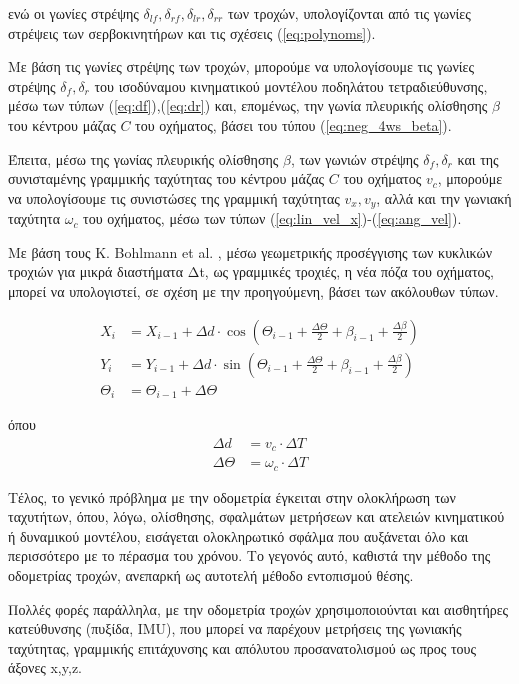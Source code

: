 \bigskip\noindent
ενώ  οι γωνίες στρέψης $\delta_{lf}, \delta_{rf}, \delta_{lr}, \delta_{rr}$ των τροχών, υπολογίζονται από τις γωνίες στρέψεις των σερβοκινητήρων και τις σχέσεις (\ref{eq:polynoms}).

\bigskip
Με βάση τις γωνίες στρέψης των τροχών, μπορούμε να υπολογίσουμε τις γωνίες στρέψης $\delta_f, \delta_r$ του {ισοδύναμου κινηματικού μοντέλου ποδηλάτου τετραδιεύθυνσης}, μέσω των τύπων  (\ref{eq:df}),(\ref{eq:dr}) και, επομένως, την γωνία πλευρικής ολίσθησης $\beta$ του κέντρου μάζας $C$ του οχήματος, βάσει του τύπου (\ref{eq:neg_4ws_beta}).

\bigskip
Έπειτα, μέσω της γωνίας πλευρικής ολίσθησης $\beta$, των γωνιών στρέψης $\delta_f, \delta_r$ και της συνισταμένης γραμμικής ταχύτητας του κέντρου μάζας $C$ του οχήματος $v_c$, μπορούμε να υπολογίσουμε τις συνιστώσες της γραμμική ταχύτητας $v_x, v_y$, αλλά και την γωνιακή ταχύτητα $\omega_c$ του οχήματος, μέσω των τύπων (\ref{eq:lin_vel_x})-(\ref{eq:ang_vel}).

\bigskip
Με βάση τους K. Bohlmann et al. \cite{automated_odometry}, μέσω γεωμετρικής προσέγγισης των κυκλικών τροχιών για μικρά διαστήματα Δt, ως γραμμικές τροχιές, η νέα πόζα του οχήματος, μπορεί να υπολογιστεί, σε σχέση με την προηγούμενη, βάσει των ακόλουθων τύπων.

\begin{align}
	X_{i} &= X_{i-1} + \Delta d \cdot \cos(\Theta_{i-1} + \frac{\Delta\Theta}{2} + \beta_{i-1} + \frac{\Delta\beta}{2})\\
	Y_{i} &= Y_{i-1} + \Delta d \cdot \sin(\Theta_{i-1} + \frac{\Delta\Theta}{2} + \beta_{i-1} + \frac{\Delta\beta}{2})\\
	\Theta_{i} &= \Theta_{i-1} + \Delta\Theta
\end{align}

\noindent
όπου
\begin{align}
	\Delta d &= v_c \cdot \Delta T\\
	\Delta\Theta &= \omega_c \cdot \Delta T
\end{align}

\bigskip
Τέλος, το γενικό πρόβλημα με την οδομετρία έγκειται στην ολοκλήρωση των ταχυτήτων, όπου, λόγω, ολίσθησης, σφαλμάτων μετρήσεων και ατελειών κινηματικού ή δυναμικού μοντέλου, εισάγεται ολοκληρωτικό σφάλμα που αυξάνεται όλο και περισσότερο με το πέρασμα του χρόνου. Το γεγονός αυτό, καθιστά την μέθοδο της οδομετρίας τροχών, ανεπαρκή ως αυτοτελή μέθοδο εντοπισμού θέσης.

\bigskip
Πολλές φορές παράλληλα, με την οδομετρία τροχών χρησιμοποιούνται και αισθητήρες κατεύθυνσης (πυξίδα, IMU), που μπορεί να παρέχουν μετρήσεις της γωνιακής ταχύτητας, γραμμικής επιτάχυνσης και απόλυτου προσανατολισμού ως προς τους άξονες x,y,z.

